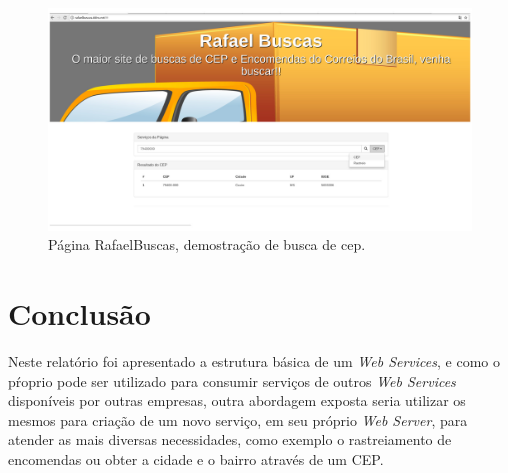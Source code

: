 \documentclass[12pt]{article}
\begin{document}
	  		 \begin{figure}[H]
	  		\centering
	  		\includegraphics[scale=0.23]{Imagens/c2.jpg}
	  		\caption{Página RafaelBuscas, demostração de busca de cep.}
	  		\label{c2}
	  	\end{figure}
\section{Conclusão}
Neste relatório foi apresentado a estrutura básica de um \textit{Web Services}, e como o pŕoprio pode ser utilizado para consumir serviços de outros \textit{Web Services} disponíveis por outras empresas, outra abordagem exposta seria utilizar os mesmos para criação de um novo serviço, em seu próprio \textit{Web Server}, para atender as mais diversas necessidades, como exemplo o rastreiamento de encomendas ou obter a cidade e o bairro através de um CEP.	  	

	  
\end{document}
